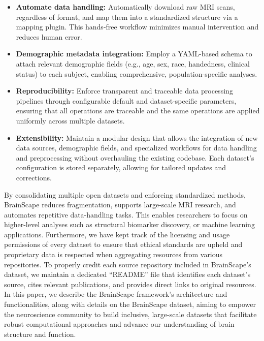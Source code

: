 \begin{itemize}
    
    \item \textbf{Automate data handling:} 
    Automatically download raw MRI scans, regardless of format, and map them into a standardized structure via a mapping plugin. 
    This hands-free workflow minimizes manual intervention and reduces human error.

    \item \textbf{Demographic metadata integration:}
    Employ a YAML-based schema to attach relevant demographic fields (e.g., age, sex, race, handedness, clinical status) to each subject, 
    enabling comprehensive, population-specific analyses.

    \item \textbf{Reproducibility:}
    Enforce transparent and traceable data processing pipelines through configurable default and dataset-specific parameters, ensuring 
    that all operations are traceable and the same operations are applied uniformly across multiple datasets.

    \item \textbf{Extensibility:}
    Maintain a modular design that allows the integration of new data sources, demographic fields, and specialized workflows for data handling and preprocessing 
    without overhauling the existing codebase. 
    Each dataset's configuration is stored separately, allowing for tailored updates and corrections.

\end{itemize}

By consolidating multiple open datasets and enforcing standardized methods, BrainScape reduces fragmentation, 
supports large-scale MRI research, and automates repetitive data-handling tasks. 
This enables researchers to focus on higher-level analyses such as structural biomarker discovery, 
or machine learning applications.
Furthermore, we have kept track of the licensing and usage permissions of every dataset to ensure that ethical 
standards are upheld and proprietary data is respected when aggregating resources from various repositories.
To properly credit each source repository included in BrainScape's dataset, we maintain a dedicated ``README'' file 
that identifies each dataset's source, cites relevant publications, and provides direct links to original resources.
In this paper, we describe the BrainScape framework's architecture and functionalities, 
along with details on the BrainScape dataset, 
aiming to empower the neuroscience community to build inclusive, 
large-scale datasets that facilitate robust computational approaches 
and advance our understanding of brain structure and function.
